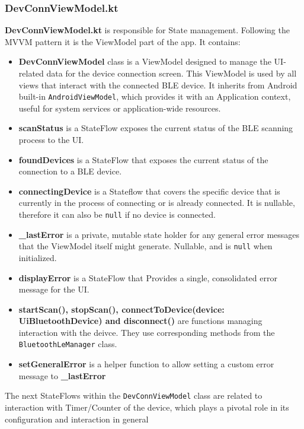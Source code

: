 \subsubsection{DevConnViewModel.kt}
\textbf{DevConnViewModel.kt} is responsible for State management. Following the \ac{MVVM} pattern it is the ViewModel part of the app. It contains:
\begin{itemize}
	\item \textbf{DevConnViewModel} class is a ViewModel designed to manage the UI-related data for the device connection screen.  This ViewModel is used by all views that interact with the connected \ac{BLE} device. It inherits from Android built-in \texttt{AndroidViewModel}, which provides it with an Application context, useful for system services or application-wide resources.
	\item \textbf{scanStatus} is a StateFlow exposes the current status of the BLE scanning process to the UI.
	\item \textbf{foundDevices} is a StateFlow that exposes the current status of the connection to a BLE device. 
	\item \textbf{connectingDevice} is a Stateflow that covers the specific device that is currently in the process of connecting or is already connected. It is nullable, therefore it can also be \texttt{null} if no device is connected.
	\item \textbf{\_lastError} is a private, mutable state holder for any general error messages that the ViewModel itself might generate. Nullable, and is \texttt{null} when initialized.
	\item  \textbf{displayError} is a StateFlow that Provides a single, consolidated error message for the UI. 
	\item \textbf{startScan(), stopScan(), connectToDevice(device: UiBluetoothDevice) and disconnect()} are functions managing interaction with the deivce. They use corresponding methods from the \texttt{BluetoothLeManager} class.
	\item \textbf{setGeneralError} is a helper function to allow setting a custom error message to \textbf{\_lastError}
\end{itemize}
The next StateFlows within the \texttt{DevConnViewModel} class are related to interaction with Timer/Counter of the device, which plays a pivotal role in its configuration and interaction in general
